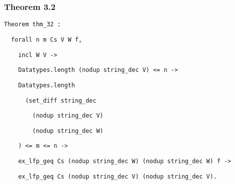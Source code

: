 \documentclass[slides]{beamer}
\begin{document}
\begin{frame}[fragile]
    \frametitle{Theorem 3.2}

    \begin{minipage}{\linewidth}\lstinline{Theorem thm_32 :}\end{minipage}
    \begin{minipage}{\linewidth}\lstinline{  forall n m Cs V W f,}\end{minipage}
    \begin{minipage}{\linewidth}\lstinline{    incl W V ->}\end{minipage}
    \begin{minipage}{\linewidth}\lstinline{    Datatypes.length (nodup string_dec V) <= n ->}\end{minipage}
    \begin{minipage}{\linewidth}\lstinline{    Datatypes.length}\end{minipage}
    \begin{minipage}{\linewidth}\lstinline{      (set_diff string_dec}\end{minipage}
    \begin{minipage}{\linewidth}\lstinline{        (nodup string_dec V)}\end{minipage}
    \begin{minipage}{\linewidth}\lstinline{        (nodup string_dec W)}\end{minipage}
    \begin{minipage}{\linewidth}\lstinline{    ) <= m <= n ->}\end{minipage}
    \begin{minipage}{\linewidth}\lstinline{    ex_lfp_geq Cs (nodup string_dec W) (nodup string_dec W) f ->}\end{minipage}
    \begin{minipage}{\linewidth}\lstinline{    ex_lfp_geq Cs (nodup string_dec V) (nodup string_dec V).}\end{minipage}
\end{frame}
\end{document}
